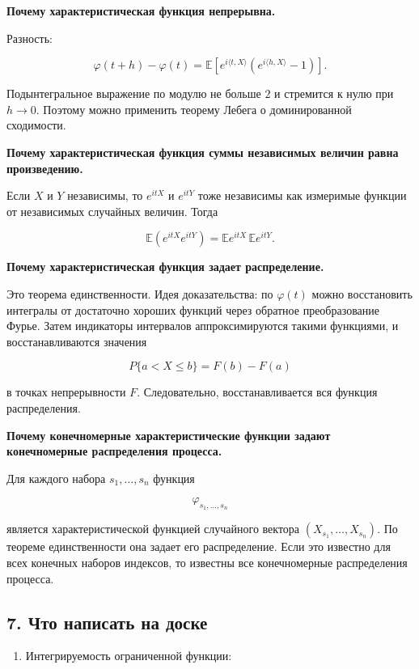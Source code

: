\documentclass[
  11pt,
  a4paper,
]{article}
\providecommand{\tightlist}{%
  \setlength{\itemsep}{0pt}\setlength{\parskip}{0pt}}
\begin{document}
\textbf{Почему характеристическая функция непрерывна.}

Разность:

\[
\varphi(t+h)-\varphi(t)
=
\mathbb E\left[e^{i\langle t,X\rangle}(e^{i\langle h,X\rangle}-1)\right].
\]

Подынтегральное выражение по модулю не больше \(2\) и стремится к нулю
при \(h\to0\). Поэтому можно применить теорему Лебега о доминированной
сходимости.

\textbf{Почему характеристическая функция суммы независимых величин
равна произведению.}

Если \(X\) и \(Y\) независимы, то \(e^{itX}\) и \(e^{itY}\) тоже
независимы как измеримые функции от независимых случайных величин. Тогда

\[
\mathbb E(e^{itX}e^{itY})
=
\mathbb E e^{itX}\,\mathbb E e^{itY}.
\]

\textbf{Почему характеристическая функция задает распределение.}

Это теорема единственности. Идея доказательства: по \(\varphi(t)\) можно
восстановить интегралы от достаточно хороших функций через обратное
преобразование Фурье. Затем индикаторы интервалов аппроксимируются
такими функциями, и восстанавливаются значения

\[
P\{a<X\le b\}=F(b)-F(a)
\]

в точках непрерывности \(F\). Следовательно, восстанавливается вся
функция распределения.

\textbf{Почему конечномерные характеристические функции задают
конечномерные распределения процесса.}

Для каждого набора \(s_1,\ldots,s_n\) функция

\[
\varphi_{s_1,\ldots,s_n}
\]

является характеристической функцией случайного вектора
\((X_{s_1},\ldots,X_{s_n})\). По теореме единственности она задает его
распределение. Если это известно для всех конечных наборов индексов, то
известны все конечномерные распределения процесса.

\subsection{7. Что написать на
доске}\label{ux447ux442ux43e-ux43dux430ux43fux438ux441ux430ux442ux44c-ux43dux430-ux434ux43eux441ux43aux435}

\begin{enumerate}
\def\labelenumi{\arabic{enumi}.}
\tightlist
\item
  Интегрируемость ограниченной функции:
\end{enumerate}
\end{document}
